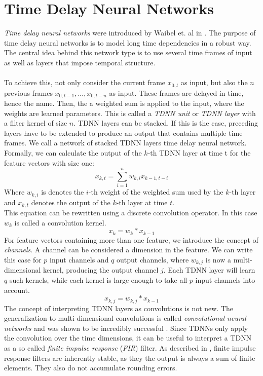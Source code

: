 
\section{Time Delay Neural Networks}
\label{sec:tdnn}

\textit{Time delay neural networks} were introduced by Waibel et. al in \cite{waibel1990phoneme}. The purpose of time delay neural networks is to model long time dependencies in a robust way. The central idea behind this network type is to use several time frames of input as well as layers that impose temporal structure. \\ \\
To achieve this, not only consider the current frame $x_{0,t}$ as input, but also the $n$ previous frames $x_{0,t - 1}, ..., x_{0,t - n}$ as input. These frames are delayed in time, hence the name. Then, the a weighted sum is applied to the input, where the weights are learned parameters. This is called a \textit{TDNN unit} or \textit{TDNN layer} with a filter kernel of size $n$. TDNN layers can be stacked. If this is the case, preceding layers have to be extended to produce an output that contains multiple time frames. We call a network of stacked TDNN layers time delay neural network. \\
Formally, we can calculate the output of the $k$-th TDNN layer at time t for the feature vectors with size one:
\[
x_{k,t} = \sum_{i = 1}^n w_{k, i} x_{k - 1, t - i}
\]
Where $w_{k, i}$ is denotes the $i$-th weight of the weighted sum used by the $k$-th layer and $x_{k,t}$ denotes the output of the $k$-th layer at time $t$. \\
This equation can be rewritten using a discrete convolution operator. In this case $w_k$ is called a convolution kernel. 
\[
x_{k} = w_{k} * x_{k - 1}
\]
For feature vectors containing more than one feature, we introduce the concept of \textit{channels}. A channel can be considered a dimension in the feature. We can write this case for $p$ input channels and $q$ output channels, where $w_{k, j}$ is now a multi-dimensional kernel, producing the output channel $j$. Each TDNN layer will learn $q$ such kernels, while each kernel is large enough to take all $p$ input channels into account. 
\[
x_{k,j} = w_{k, j} * x_{k - 1}
\]
The concept of interpreting TDNN layers as convolutions is not new. The generalization to multi-dimensional convolutions is called \textit{convolutional neural networks} and was shown to be incredibly successful \cite{krizhevsky2012imagenet}. Since TDNNs only apply the convolution over the time dimensions, it can be useful to interpret a TDNN as a so called \textit{finite impulse response} (\textit{FIR}) filter. As described in \cite{leon2015signale}, finite impulse response filters are inherently stable, as they the output is always a sum of finite elements. They also do not accumulate rounding errors. \\
